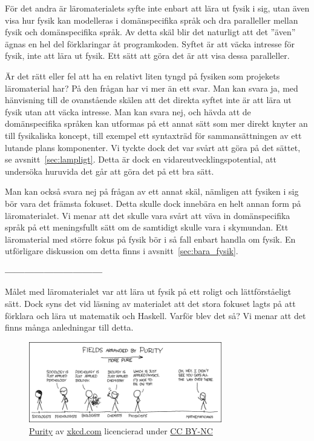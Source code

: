 \begin{draft}
För det andra är läromaterialets syfte inte enbart att lära ut fysik i sig, utan
även visa hur fysik kan modelleras i domänspecifika språk och dra paralleller
mellan fysik och domänspecifika språk. Av detta skäl blir det naturligt att det
''även'' ägnas en hel del förklaringar åt programkoden. Syftet är att väcka
intresse för fysik, inte att lära ut fysik. Ett sätt att göra det är att visa
dessa paralleller.

Är det rätt eller fel att ha en relativt liten tyngd på fysiken som projekets
läromaterial har? På den frågan har vi mer än ett svar. Man kan svara ja, med
hänvisning till de ovanstående skälen att det direkta syftet inte är att lära ut
fysik utan att väcka intresse. Man kan svara nej, och hävda att de
domänspecifika språken kan utformas på ett annat sätt som mer direkt knyter an
till fysikaliska koncept, till exempel ett syntaxträd för sammansättningen av
ett lutande plans komponenter. Vi tyckte dock det var svårt att göra på det
sättet, se avsnitt~\ref{sec:lampligt}. Detta är dock en
vidareutvecklingspotential, att undersöka huruvida det går att göra det på ett
bra sätt.

Man kan också svara nej på frågan av ett annat skäl, nämligen att fysiken i sig
bör vara det främsta fokuset. Detta skulle dock innebära en helt annan form på
läromaterialet. Vi menar att det skulle vara svårt att väva in domänspecifika
språk på ett meningsfullt sätt om de samtidigt skulle vara i skymundan. Ett
läromaterial med större fokus på fysik bör i så fall enbart handla om fysik. En
utförligare diskussion om detta finns i avsnitt~\ref{sec:bara_fysik}.

\textbf{------------------------------}

Målet med läromaterialet var att lära ut fysik på ett roligt och lättförståeligt
sätt. Dock syns det vid läsning av materialet att det stora fokuset lagts på att
förklara och lära ut matematik och Haskell. Varför blev det så? Vi menar att det
finns många anledningar till detta. 

\begin{figure}[tph]
  \centering
  \includegraphics[width=0.75\textwidth]{figure/purity.png}
  \caption{\href{https://xkcd.com/435/}{Purity} av \href{https://xkcd.com}{xkcd.com} licencierad under
  \href{https://creativecommons.org/licenses/by-nc/2.5/}{CC BY-NC}}
\end{figure} 


\end{draft}
